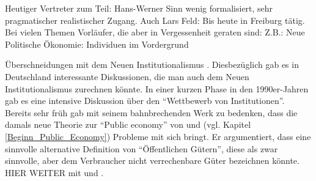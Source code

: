 Heutiger Vertreter zum Teil: Hans-Werner Sinn wenig formalisiert, sehr pragmatischer realistischer Zugang. Auch Lars Feld: Bis heute in Freiburg tätig.
Bei vielen Themen Vorläufer, die aber in Vergessenheit geraten sind: Z.B.: Neue Politische Ökonomie: Individuen im Vordergrund




Überschneidungen mit dem Neuen Institutionalismus \parencite[S. 45]{Voigt2009}. Diesbezüglich gab es in Deutschland interessante Diskussionen, die man auch dem Neuen Institutionalismus zurechnen könnte. In einer kurzen Phase in den 1990er-Jahren gab es eine intensive Diskussion über den "`Wettbewerb von Institutionen"'. Bereits sehr früh gab \textcite{Tiebout1956} mit seinem bahnbrechenden Werk zu bedenken, dass die damals neue Theorie zur "`Public economy"' von \textcite{Musgrave1956} und \textcite{Samuelson1954} (vgl. Kapitel \ref{Beginn_Public_Economy}) Probleme mit sich bringt. Er argumentiert, dass eine sinnvolle alternative Definition von "`Öffentlichen Gütern"', diese als zwar sinnvolle, aber dem Verbraucher nicht verrechenbare Güter bezeichnen könnte. HIER WEITER mit \textcite{Tiebout1956} und \textcite[S. 169]{Voigt2009}.











